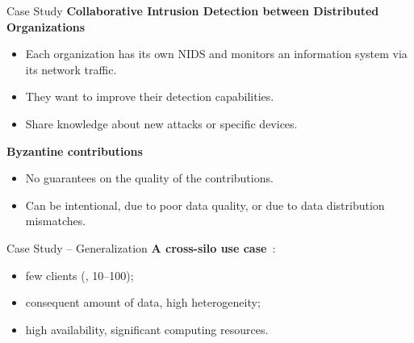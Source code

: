\begin{frame}{Case Study}
  \textbf{Collaborative Intrusion Detection between Distributed Organizations}
  \begin{itemize}
    \item Each organization has its own NIDS and monitors an information system via its network traffic.
    \item They want to improve their detection capabilities.
    \item Share knowledge about new attacks or specific devices.
  \end{itemize}
  
  \pause
  \textbf{Byzantine contributions}
  \begin{itemize}
    \item No guarantees on the quality of the contributions.
    \item Can be intentional, due to poor data quality, or due to data distribution mismatches.
  \end{itemize}
\end{frame}

\begin{frame}{Case Study -- Generalization}
  \textbf{A cross-silo use case}~\cite{kairouz_AdvancesOpenProblems_2021}:
  \begin{itemize}
    \item few clients (\ie, 10--100);
    \item consequent amount of data, high heterogeneity;
    \item high availability, significant computing resources.
  \end{itemize}
\end{frame}

